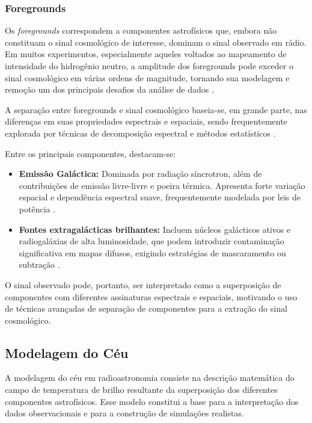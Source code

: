\subsubsection{Foregrounds}

Os \textit{foregrounds} correspondem a componentes astrofísicos que, embora não constituam o sinal cosmológico de interesse, dominam o sinal observado em rádio. Em muitos experimentos, especialmente aqueles voltados ao mapeamento de intensidade do hidrogênio neutro, a amplitude dos foregrounds pode exceder o sinal cosmológico em várias ordens de magnitude, tornando sua modelagem e remoção um dos principais desafios da análise de dados \cite{mericia2019hi}.

A separação entre foregrounds e sinal cosmológico baseia-se, em grande parte, nas diferenças em suas propriedades espectrais e espaciais, sendo frequentemente explorada por técnicas de decomposição espectral e métodos estatísticos \cite{mericia2023bingotese}.

Entre os principais componentes, destacam-se:

\begin{itemize}
    \item \textbf{Emissão Galáctica:} Dominada por radiação síncrotron, além de contribuições de emissão livre-livre e poeira térmica. Apresenta forte variação espacial e dependência espectral suave, frequentemente modelada por leis de potência \cite{mericia2023bingotese}.

    \item \textbf{Fontes extragalácticas brilhantes:} Incluem núcleos galácticos ativos e radiogaláxias de alta luminosidade, que podem introduzir contaminação significativa em mapas difusos, exigindo estratégias de mascaramento ou subtração \cite{mericia2023bingotese}.
\end{itemize}

O sinal observado pode, portanto, ser interpretado como a superposição de componentes com diferentes assinaturas espectrais e espaciais, motivando o uso de técnicas avançadas de separação de componentes para a extração do sinal cosmológico.

\subsection{Modelagem do Céu}

A modelagem do céu em radioastronomia consiste na descrição matemática do campo de temperatura de brilho resultante da superposição dos diferentes componentes astrofísicos. Esse modelo constitui a base para a interpretação dos dados observacionais e para a construção de simulações realistas.

